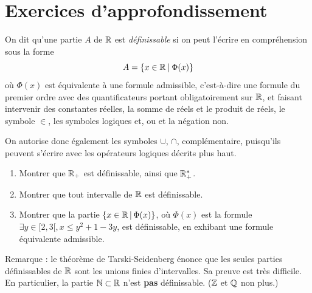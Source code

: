 \section{Exercices d'approfondissement}

\begin{exercice}
On dit qu'une partie $A$ de $\mathbb{R}$ est \emph{définissable} si on peut l'écrire en compréhension sous la forme
\[ A=\{x\in \mathbb{R}\:|\: \Phi(x)\}\]
où $\Phi(x)$ est équivalente à une \og formule admissible\fg, c'est-à-dire une formule du premier ordre avec des quantificateurs portant obligatoirement sur $\mathbb{R}$, et faisant intervenir des constantes réelles, la somme de réels et le produit de réels, le symbole $\in$, les symboles logiques \og et\fg, \og ou\fg{} et la négation \og non\fg.

On autorise donc également les symboles $\cup$, $\cap$, complémentaire, puisqu'ils peuvent s'écrire avec les opérateurs logiques décrits plus haut.

\begin{enumerate}
\item Montrer que $\mathbb{R}_+$ est définissable, ainsi que $\mathbb{R}_+^*$.
\item Montrer que tout intervalle de $\mathbb{R}$ est définissable.
\item Montrer que la partie $\ensemble{x\in\R}{\Phi(x)}$, où $\Phi(x)$ est la formule $\exists y\in [2,3[, x\leq y^2+1-3y$, est définissable, en exhibant une formule équivalente admissible.
\end{enumerate}
Remarque : le théorème de Tarski-Seidenberg énonce que les seules parties définissables de $\mathbb{R}$ sont les unions finies d'intervalles. Sa preuve est très difficile. En particulier, la partie $\mathbb{N} \subset \mathbb{R}$ n'est \textbf{pas} définissable. ($\mathbb{Z}$ et $\mathbb{Q}$ non plus.)
\end{exercice}


